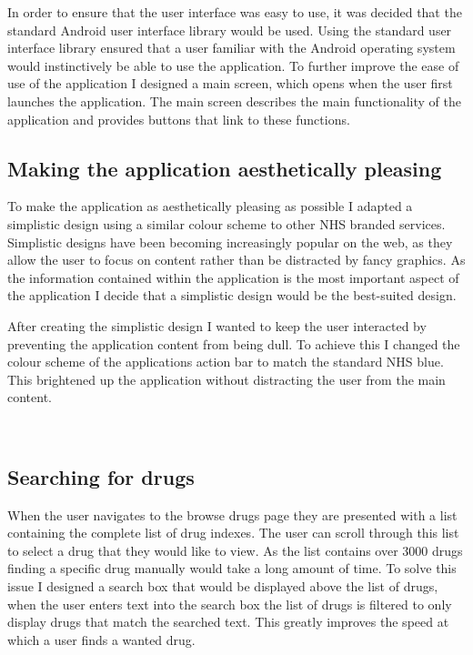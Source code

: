 In order to ensure that the user interface was easy to use, it was decided that the standard Android user interface library would be used. Using the standard user interface library \cite{android_design} ensured that a user familiar with the Android operating system would instinctively be able to use the application. To further improve the ease of use of the application I designed a main screen, which opens when the user first launches the application. The main screen describes the main functionality of the application and provides buttons that link to these functions.

\subsection{Making the application aesthetically pleasing}

To make the application as aesthetically pleasing as possible I adapted a simplistic design using a similar colour scheme to other NHS branded services. Simplistic designs have been becoming increasingly popular on the web, as they allow the user to focus on content rather than be distracted by fancy graphics. As the information contained within the application is the most important aspect of the application I decide that a simplistic design would be the best-suited design.

After creating the simplistic design I wanted to keep the user interacted by preventing the application content from being dull. To achieve this I changed the colour scheme of the applications action bar to match the standard NHS \cite{nhs_website} blue. This brightened up the application without distracting the user from the main content.

 
\subsection{Searching for drugs}
When the user navigates to the browse drugs page they are presented with a list containing the complete list of drug indexes. The user can scroll through this list to select a drug that they would like to view. As the list contains over 3000 drugs finding a specific drug manually would take a long amount of time. To solve this issue I designed a search box that would be displayed above the list of drugs, when the user enters text into the search box the list of drugs is filtered to only display drugs that match the searched text. This greatly improves the speed at which a user finds a wanted drug.

